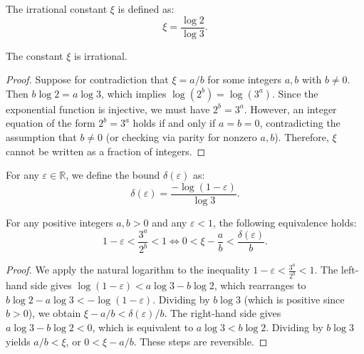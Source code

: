\begin{definition}\label{def:xi}\leanok
The irrational constant $\xi$ is defined as:
\begin{equation}
    \xi = \frac{\log 2}{\log 3}.
\end{equation}
\end{definition}

\begin{lemma}\label{lemma:irrational_xi}\leanok
The constant $\xi$ is irrational.
\end{lemma}
\begin{proof}\leanok
Suppose for contradiction that $\xi = a/b$ for some integers $a, b$ with $b \ne 0$. Then $b \log 2 = a \log 3$, which implies $\log(2^b) = \log(3^a)$. Since the exponential function is injective, we must have $2^b = 3^a$. However, an integer equation of the form $2^b = 3^a$ holds if and only if $a = b = 0$, contradicting the assumption that $b \ne 0$ (or checking via parity for nonzero $a, b$). Therefore, $\xi$ cannot be written as a fraction of integers.
\end{proof}

\begin{definition}\label{def:delta}\leanok
For any $\varepsilon \in \mathbb{R}$, we define the bound $\delta(\varepsilon)$ as:
\begin{equation}
    \delta(\varepsilon) = \frac{-\log(1 - \varepsilon)}{\log 3}.
\end{equation}
\end{definition}

\begin{lemma}\label{lemma:inequality_equiv}\leanok
For any positive integers $a, b > 0$ and any $\varepsilon < 1$, the following equivalence holds:
\begin{equation}
    1 - \varepsilon < \frac{3^a}{2^b} < 1 \iff 0 < \xi - \frac{a}{b} < \frac{\delta(\varepsilon)}{b}.
\end{equation}
\end{lemma}
\begin{proof}\leanok
We apply the natural logarithm to the inequality $1 - \varepsilon < \frac{3^a}{2^b} < 1$.
The left-hand side gives $\log(1 - \varepsilon) < a \log 3 - b \log 2$, which rearranges to $b \log 2 - a \log 3 < -\log(1 - \varepsilon)$.
Dividing by $b \log 3$ (which is positive since $b > 0$), we obtain $\xi - a/b < \delta(\varepsilon)/b$.
The right-hand side gives $a \log 3 - b \log 2 < 0$, which is equivalent to $a \log 3 < b \log 2$. Dividing by $b \log 3$ yields $a/b < \xi$, or $0 < \xi - a/b$.
These steps are reversible.
\end{proof}

